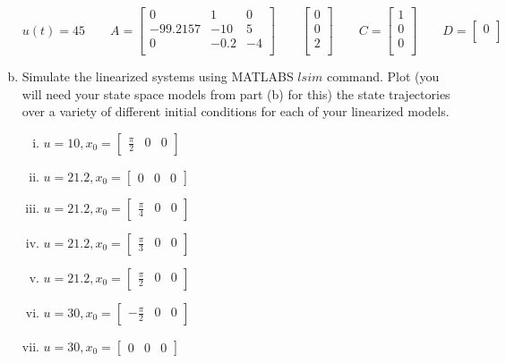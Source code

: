 \documentclass{article}
\begin{document}
\begin{enumerate}[a)]
$$
u(t) = 45
\qquad
A
=
\begin{bmatrix}
0 & 1 & 0 \\
-99.2157 & -10 & 5 \\
0 & -0.2 & -4 \\
\end{bmatrix}
\qquad
\begin{bmatrix}
0 \\
0 \\
2 \\
\end{bmatrix}
\qquad
C =
\begin{bmatrix}
1 \\
0 \\
0 \\
\end{bmatrix}
\qquad
D =
\begin{bmatrix}
0 \\
\end{bmatrix}
$$

\item Simulate the linearized systems using MATLABS $lsim$ command.
Plot (you will need your state space models from part (b) for this) the state trajectories over a variety of different initial conditions for each of your linearized models.
\begin{enumerate}[i.]
\item $u = 10, x_0 = \begin{bmatrix} \frac{\pi}{2} & 0 & 0 \end{bmatrix}$
\item $u = 21.2, x_0 = \begin{bmatrix} 0 & 0 & 0 \end{bmatrix}$
\item $u = 21.2, x_0 = \begin{bmatrix} \frac{\pi}{4} & 0 & 0 \end{bmatrix}$
\item $u = 21.2, x_0 = \begin{bmatrix} \frac{\pi}{3} & 0 & 0 \end{bmatrix}$
\item $u = 21.2, x_0 = \begin{bmatrix} \frac{\pi}{2} & 0 & 0 \end{bmatrix}$
\item $u = 30, x_0 = \begin{bmatrix} -\frac{\pi}{2} & 0 & 0 \end{bmatrix}$
\item $u = 30, x_0 = \begin{bmatrix} 0 & 0 & 0 \end{bmatrix}$
\end{enumerate}


\end{enumerate}
\end{document}
